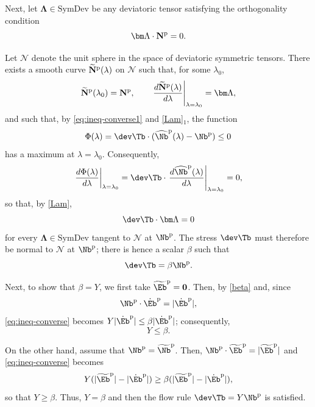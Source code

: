 \begin{enumerate}
	Next, let $\bm\Lambda \in \text{SymDev}$ be any deviatoric tensor satisfying the orthogonality condition
	\begin{equation}
		\bm\Lambda \cdot\mathbf{N}^{\rm p} = 0. 
	\end{equation}
	
	Let $\mathcal{N}$ denote the unit sphere in the space of deviatoric symmetric tensors. There exists a smooth curve $\widetilde{\mathbf{N}}^{\rm p}(\lambda)$ on $\mathcal{N}$ such that, for some $\lambda_0$,
	\begin{equation}\label{Lam}
		\widetilde{\mathbf{N}}^{\rm p}(\lambda_0) = \mathbf{N}^{\rm p}, \qquad \left.\frac{d\widetilde{\mathbf{N}}^{\rm p}(\lambda)}{d\lambda}\right|_{\lambda = \lambda_0} = \bm\Lambda,
	\end{equation}
	 and such that, by \eqref{eq:ineq-converse1}  and \eqref{Lam}$_1$, the function
\begin{equation}
	\Phi(\lambda) = \dev\Tb\cdot (\widehat{\Nb}^{\rm p}(\lambda) - \Nb^{\rm p}) \leq 0 
\end{equation}
has a maximum at $\lambda = \lambda_0$. Consequently,
\[
\left. \frac{d\Phi(\lambda)}{d\lambda} \right|_{\lambda = \lambda_0} = \dev\Tb\cdot \left. \frac{d\widehat{\Nb}^{\rm p}(\lambda)}{d\lambda} \right|_{\lambda = \lambda_0} = 0,
\]
so that, by \eqref{Lam},
\begin{equation}\label{beta}
	\dev\Tb \cdot\bm\Lambda = 0 
\end{equation}
for every $\bm\Lambda \in \mathrm{SymDev}$ tangent to $\mathcal{N}$ at $\Nb^{\rm p}$. The stress $\dev\Tb$ must therefore be normal to $\mathcal{N}$ at $\Nb^{\rm p}$; there is hence a scalar $\beta$ such that
\begin{equation}
	\dev\Tb= \beta \Nb^{\rm p}.
\end{equation}

Next, to show that $\beta = Y$, we first take $\widetilde{\Eb}^{\rm p} = \mathbf{0}$. Then, by \eqref{beta} and, since
\[
\Nb^{\rm p} \cdot \dot{\Eb}^{\rm p} = |\dot{\Eb}^{\rm p}|,
\]
\eqref{eq:ineq-converse} becomes $Y|\dot{\Eb}^{\rm p}| \leq \beta |\dot{\Eb}^{\rm p}|$; consequently,
\begin{equation}
	Y \leq \beta.
\end{equation}

On the other hand, assume that $\Nb^{\rm p} = \widetilde{\Nb}^{\rm p}$. Then, $\Nb^{\rm p} \cdot \widetilde{\Eb}^{\rm p} = |\widetilde{\Eb}^{\rm p}|$ and \eqref{eq:ineq-converse} becomes
\[
Y(|\widetilde{\Eb}^{\rm p}| - |\dot{\Eb}^{\rm p}|) \geq \beta (|\widetilde{\Eb}^{\rm p}| - |\dot{\Eb}^{\rm p}|),
\]
so that $Y \geq \beta$. Thus, $Y = \beta$ and then the flow rule $\dev\Tb = Y \Nb^{\rm p}$ is satisfied. 
\end{enumerate}

